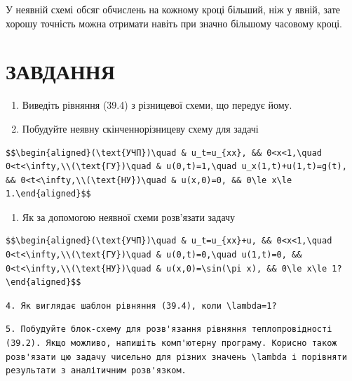\documentclass[
  ukrainian,
]{article}
\providecommand{\tightlist}{%
  \setlength{\itemsep}{0pt}\setlength{\parskip}{0pt}}
\begin{document}
У неявній схемі обсяг обчислень на кожному кроці більший, ніж у явній,
зате хорошу точність можна отримати навіть при значно більшому часовому
кроці.

\section{ЗАВДАННЯ}\label{ux437ux430ux432ux434ux430ux43dux43dux44f-21}

\begin{enumerate}
\def\labelenumi{\arabic{enumi}.}
\item
  Виведіть рівняння (39.4) з різницевої схеми, що передує йому.
\item
  Побудуйте неявну скінченнорізницеву схему для задачі
\end{enumerate}

\begin{verbatim}
$$\begin{aligned}(\text{УЧП})\quad & u_t=u_{xx}, && 0<x<1,\quad 0<t<\infty,\\(\text{ГУ})\quad & u(0,t)=1,\quad u_x(1,t)+u(1,t)=g(t), && 0<t<\infty,\\(\text{НУ})\quad & u(x,0)=0, && 0\le x\le 1.\end{aligned}$$
\end{verbatim}

\begin{enumerate}
\def\labelenumi{\arabic{enumi}.}
\setcounter{enumi}{2}
\tightlist
\item
  Як за допомогою неявної схеми розв'язати задачу
\end{enumerate}

\begin{verbatim}
$$\begin{aligned}(\text{УЧП})\quad & u_t=u_{xx}+u, && 0<x<1,\quad 0<t<\infty,\\(\text{ГУ})\quad & u(0,t)=0,\quad u(1,t)=0, && 0<t<\infty,\\(\text{НУ})\quad & u(x,0)=\sin(\pi x), && 0\le x\le 1?\end{aligned}$$
\end{verbatim}

\begin{verbatim}
4. Як виглядає шаблон рівняння (39.4), коли \lambda=1?
\end{verbatim}

\begin{verbatim}
5. Побудуйте блок-схему для розв'язання рівняння теплопровідності (39.2). Якщо можливо, напишіть комп'ютерну програму. Корисно також розв'язати цю задачу чисельно для різних значень \lambda і порівняти результати з аналітичним розв'язком.
\end{verbatim}
\end{document}
